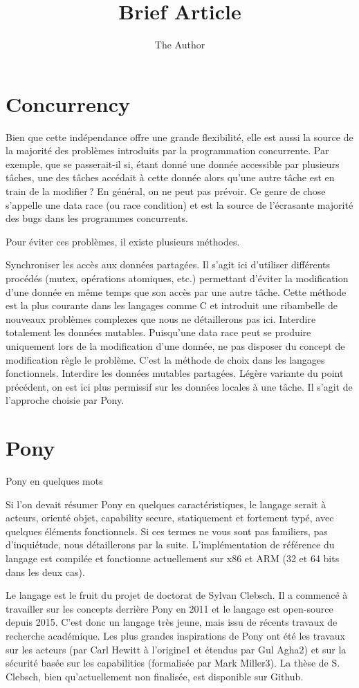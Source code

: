 \documentclass[11pt, oneside]{article}   	%
\title{Brief Article}
\author{The Author}
\begin{document}
\maketitle
\section{Concurrency}
Bien que cette indépendance offre une grande flexibilité, elle est aussi la source de la majorité des problèmes introduits par la programmation concurrente. Par exemple, que se passerait-il si, étant donné une donnée accessible par plusieurs tâches, une des tâches accédait à cette donnée alors qu’une autre tâche est en train de la modifier ? En général, on ne peut pas prévoir. Ce genre de chose s’appelle une data race (ou race condition) et est la source de l’écrasante majorité des bugs dans les programmes concurrents.

Pour éviter ces problèmes, il existe plusieurs méthodes.

    Synchroniser les accès aux données partagées. Il s’agit ici d’utiliser différents procédés (mutex, opérations atomiques, etc.) permettant d’éviter la modification d’une donnée en même temps que son accès par une autre tâche. Cette méthode est la plus courante dans les langages comme C et introduit une ribambelle de nouveaux problèmes complexes que nous ne détaillerons pas ici.
    Interdire totalement les données mutables. Puisqu’une data race peut se produire uniquement lors de la modification d’une donnée, ne pas disposer du concept de modification règle le problème. C’est la méthode de choix dans les langages fonctionnels.
    Interdire les données mutables partagées. Légère variante du point précédent, on est ici plus permissif sur les données locales à une tâche. Il s’agit de l’approche choisie par Pony.

\section{Pony}
 Pony en quelques mots

Si l’on devait résumer Pony en quelques caractéristiques, le langage serait à acteurs, orienté objet, capability secure, statiquement et fortement typé, avec quelques éléments fonctionnels. Si ces termes ne vous sont pas familiers, pas d’inquiétude, nous détaillerons par la suite. L’implémentation de référence du langage est compilée et fonctionne actuellement sur x86 et ARM (32 et 64 bits dans les deux cas).

Le langage est le fruit du projet de doctorat de Sylvan Clebsch. Il a commencé à travailler sur les concepts derrière Pony en 2011 et le langage est open-source depuis 2015. C’est donc un langage très jeune, mais issu de récents travaux de recherche académique. Les plus grandes inspirations de Pony ont été les travaux sur les acteurs (par Carl Hewitt à l’origine1 et étendus par Gul Agha2) et sur la sécurité basée sur les capabilities (formalisée par Mark Miller3). La thèse de S. Clebsch, bien qu’actuellement non finalisée, est disponible sur Github.
\end{document}
